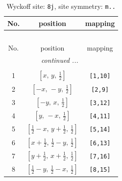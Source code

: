\documentclass[fleqn,8pt]{jsarticle}
\begin{document}
\begin{longtable}{ccc}
\caption{Wyckoff site: {\tt 8j}, site symmetry: {\tt m..}}
 \\
 \hline \hline
No. & position & mapping \\ \hline \endfirsthead

\multicolumn{2}{l}{\tablename\ \thetable{}} \\
 \hline \hline
No. & position & mapping \\ \hline \endhead

 \hline \hline
\multicolumn{2}{r}{\footnotesize\it continued ...} \\ \endfoot

 \hline \hline
\multicolumn{2}{r}{} \\ \endlastfoot

1 & $\left[ x,\, y,\, \frac{1}{2} \right]$ & {\tt [1,10]} \\ \hline
2 & $\left[ - x,\, - y,\, \frac{1}{2} \right]$ & {\tt [2,9]} \\ \hline
3 & $\left[ - y,\, x,\, \frac{1}{2} \right]$ & {\tt [3,12]} \\ \hline
4 & $\left[ y,\, - x,\, \frac{1}{2} \right]$ & {\tt [4,11]} \\ \hline
5 & $\left[ \frac{1}{2} - x,\, y + \frac{1}{2},\, \frac{1}{2} \right]$ & {\tt [5,14]} \\ \hline
6 & $\left[ x + \frac{1}{2},\, \frac{1}{2} - y,\, \frac{1}{2} \right]$ & {\tt [6,13]} \\ \hline
7 & $\left[ y + \frac{1}{2},\, x + \frac{1}{2},\, \frac{1}{2} \right]$ & {\tt [7,16]} \\ \hline
8 & $\left[ \frac{1}{2} - y,\, \frac{1}{2} - x,\, \frac{1}{2} \right]$ & {\tt [8,15]} \\
\end{longtable}
\renewcommand{\arraystretch}{1.2}
\end{document}
